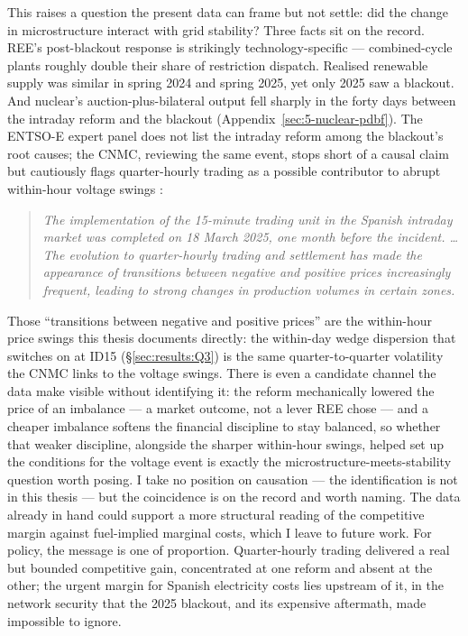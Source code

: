 \documentclass[11pt,a4paper]{article}
\theoremstyle{definition}
\theoremstyle{remark}
\theoremstyle{plain}
\begin{document}
This raises a question the present data can frame but not settle: did the change in microstructure interact with grid stability? Three facts sit on the record. REE's post-blackout response is strikingly technology-specific --- combined-cycle plants roughly double their share of restriction dispatch. Realised renewable supply was similar in spring 2024 and spring 2025, yet only 2025 saw a blackout. And nuclear's auction-plus-bilateral output fell sharply in the forty days between the intraday reform and the blackout (Appendix~\ref{sec:5-nuclear-pdbf}). The ENTSO-E expert panel does not list the intraday reform among the blackout's root causes; the CNMC, reviewing the same event, stops short of a causal claim but cautiously flags quarter-hourly trading as a possible contributor to abrupt within-hour voltage swings \citep[p.~44]{cnmc_blackout_recommendations_2026}:
\begin{quote}
\itshape The implementation of the 15-minute trading unit in the Spanish intraday market was completed on 18 March 2025, one month before the incident. \ldots The evolution to quarter-hourly trading and settlement has made the appearance of transitions between negative and positive prices increasingly frequent, leading to strong changes in production volumes in certain zones.
\end{quote}
\noindent Those ``transitions between negative and positive prices'' are the within-hour price swings this thesis documents directly: the within-day wedge dispersion that switches on at ID15 (\S\ref{sec:results:Q3}) is the same quarter-to-quarter volatility the CNMC links to the voltage swings. There is even a candidate channel the data make visible without identifying it: the reform mechanically lowered the price of an imbalance --- a market outcome, not a lever REE chose --- and a cheaper imbalance softens the financial discipline to stay balanced, so whether that weaker discipline, alongside the sharper within-hour swings, helped set up the conditions for the voltage event is exactly the microstructure-meets-stability question worth posing. I take no position on causation --- the identification is not in this thesis --- but the coincidence is on the record and worth naming. The data already in hand could support a more structural reading of the competitive margin against fuel-implied marginal costs, which I leave to future work. For policy, the message is one of proportion. Quarter-hourly trading delivered a real but bounded competitive gain, concentrated at one reform and absent at the other; the urgent margin for Spanish electricity costs lies upstream of it, in the network security that the 2025 blackout, and its expensive aftermath, made impossible to ignore.
\end{document}
